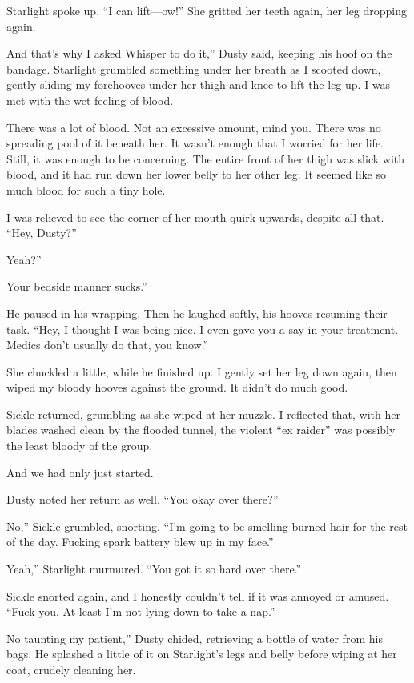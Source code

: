 Starlight spoke up. “I can lift—ow!” She gritted her teeth again, her leg dropping again.

\leavevmode{}And that’s why I asked Whisper to do it,” Dusty said, keeping his hoof on the bandage. Starlight grumbled something under her breath as I scooted down, gently sliding my forehooves under her thigh and knee to lift the leg up. I was met with the wet feeling of blood.

There was a lot of blood. Not an excessive amount, mind you. There was no spreading pool of it beneath her. It wasn’t enough that I worried for her life. Still, it was enough to be concerning. The entire front of her thigh was slick with blood, and it had run down her lower belly to her other leg. It seemed like so much blood for such a tiny hole.

I was relieved to see the corner of her mouth quirk upwards, despite all that. “Hey, Dusty?”

\leavevmode{}Yeah?”

\leavevmode{}Your bedside manner sucks.”

He paused in his wrapping. Then he laughed softly, his hooves resuming their task. “Hey, I thought I was being nice. I even gave you a say in your treatment. Medics don’t usually do that, you know.”

She chuckled a little, while he finished up. I gently set her leg down again, then wiped my bloody hooves against the ground. It didn’t do much good.

Sickle returned, grumbling as she wiped at her muzzle. I reflected that, with her blades washed clean by the flooded tunnel, the violent “ex raider” was possibly the least bloody of the group.

And we had only just started.

Dusty noted her return as well. “You okay over there?”

\leavevmode{}No,” Sickle grumbled, snorting. “I’m going to be smelling burned hair for the rest of the day. Fucking spark battery blew up in my face.”

\leavevmode{}Yeah,” Starlight murmured. “You got it so hard over there.”

Sickle snorted again, and I honestly couldn’t tell if it was annoyed or amused. “Fuck you. At least I’m not lying down to take a nap.”

\leavevmode{}No taunting my patient,” Dusty chided, retrieving a bottle of water from his bags. He splashed a little of it on Starlight’s legs and belly before wiping at her coat, crudely cleaning her.

